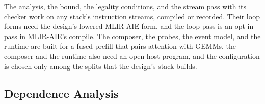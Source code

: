 The analysis, the bound, the legality conditions, and the stream pass with its checker work on any stack's instruction streams, compiled or recorded.
Their loop forms need the design's lowered MLIR-AIE form, and the loop pass is an opt-in pass in MLIR-AIE's compile.
The composer, the probes, the event model, and the runtime are built for a fused prefill that pairs attention with GEMMs, the composer and the runtime also need an open host program, and the configuration is chosen only among the splits that the design's stack builds.

\subsection{Dependence Analysis}
\label{sec:order}
\label{subsec:reading}
\label{subsec:model}

